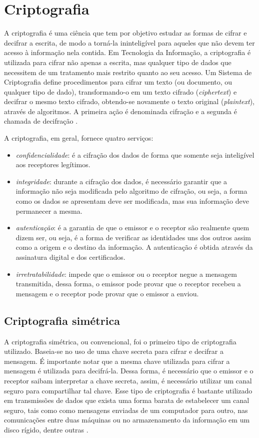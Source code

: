 %
%
\section{Criptografia} \label{sec:criptografia}
A criptografia é uma ciência que tem por objetivo estudar as formas de cifrar e decifrar a escrita, de modo a torná-la ininteligível para aqueles que não devem ter acesso à informação nela contida. Em Tecnologia da Informação, a criptografia é utilizada para cifrar não apenas a escrita, mas qualquer tipo de dados que necessitem de um tratamento mais restrito quanto ao seu acesso. Um Sistema de Criptografia define procedimentos para cifrar um texto (ou documento, ou qualquer tipo de dado), transformando-o em um texto cifrado (\textit{ciphertext}) e decifrar o mesmo texto cifrado, obtendo-se novamente o texto original (\textit{plaintext}), através de algoritmos. A primeira ação é denominada cifração e a segunda é chamada de decifração \cite{Portnoi:2005}.

A criptografia, em geral, fornece quatro serviços: \cite{Portnoi:2005}

\begin{itemize}
\item \textit{confidencialidade}: é a cifração dos dados de forma que somente seja inteligível aos receptores legítimos.
\item \textit{integridade}: durante a cifração dos dados, é necessário garantir que a informação não seja modificada pelo algoritmo de cifração, ou seja, a forma como os dados se apresentam deve ser modificada, mas sua informação deve permanecer a mesma.
\item \textit{autenticação}: é a garantia de que o emissor e o receptor são realmente quem dizem ser, ou seja, é a forma de verificar as identidades uns dos outros assim como a origem e o destino da informação. A autenticação é obtida através da assinatura digital e dos certificados.
\item \textit{irretratabilidade}: impede que o emissor ou o receptor negue a mensagem transmitida, dessa forma, o emissor pode provar que o receptor recebeu a mensagem e o receptor pode provar que o emissor a enviou.
\end{itemize}

%
%
\subsection{Criptografia simétrica}
A criptografia simétrica, ou convencional, foi o primeiro tipo de criptografia utilizado. Baseia-se no uso de uma chave secreta para cifrar e decifrar a mensagem. É importante notar que a mesma chave utilizada para cifrar a mensagem é utilizada para decifrá-la. Dessa forma, é necessário que o emissor e o receptor saibam interpretar a chave secreta, assim, é necessário utilizar um canal seguro para compartilhar tal chave. Esse tipo de criptografia é bastante utilizado em transmissões de dados que exista uma forma barata de estabelecer um canal seguro, tais como como mensagens enviadas de um computador para outro, nas comunicações entre duas máquinas ou no armazenamento da informação em um disco rígido, dentre outras \cite{Cavalcante:2015}.

